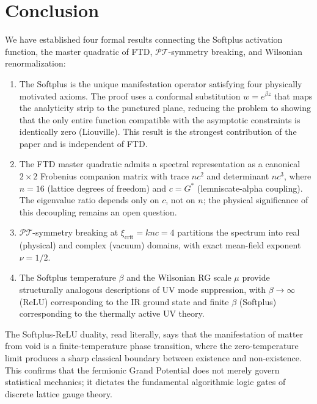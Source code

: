 \documentclass[12pt]{article}
\newcommand{\PT}{\mathcal{PT}}
\theoremstyle{definition}
\theoremstyle{remark}
\begin{document}
\section{Conclusion}

We have established four formal results connecting the Softplus activation function, the master quadratic of FTD, $\PT$-symmetry breaking, and Wilsonian renormalization:

\begin{enumerate}[noitemsep]
    \item The Softplus is the unique manifestation operator satisfying four physically motivated axioms. The proof uses a conformal substitution $w = e^{\beta z}$ that maps the analyticity strip to the punctured plane, reducing the problem to showing that the only entire function compatible with the asymptotic constraints is identically zero (Liouville). This result is the strongest contribution of the paper and is independent of FTD.
    \item The FTD master quadratic admits a spectral representation as a canonical $2 \times 2$ Frobenius companion matrix with trace $nc^2$ and determinant $nc^3$, where $n = 16$ (lattice degrees of freedom) and $c = G^{*}$ (lemniscate-alpha coupling). The eigenvalue ratio depends only on $c$, not on $n$; the physical significance of this decoupling remains an open question.
    \item $\PT$-symmetry breaking at $\xi_{\text{crit}} = knc = 4$ partitions the spectrum into real (physical) and complex (vacuum) domains, with exact mean-field exponent $\nu = 1/2$.
    \item The Softplus temperature $\beta$ and the Wilsonian RG scale $\mu$ provide structurally analogous descriptions of UV mode suppression, with $\beta \to \infty$ (ReLU) corresponding to the IR ground state and finite $\beta$ (Softplus) corresponding to the thermally active UV theory.
\end{enumerate}

The Softplus-ReLU duality, read literally, says that the manifestation of matter from void is a finite-temperature phase transition, where the zero-temperature limit produces a sharp classical boundary between existence and non-existence. This confirms that the fermionic Grand Potential does not merely govern statistical mechanics; it dictates the fundamental algorithmic logic gates of discrete lattice gauge theory.
\end{document}
